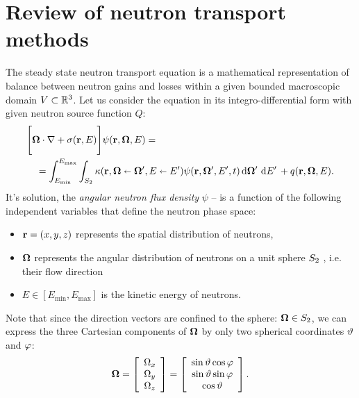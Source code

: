 \chapter{Review of neutron transport methods}\label{chap:nte-review}


The steady state neutron transport equation is a mathematical representation of balance between neutron gains and losses
within a given bounded macroscopic domain $\VV\subset\R[3]$. Let us consider the equation in its integro-differential
form with given neutron source function $Q$:
\begin{equation}\label{eq1}
  \begin{multlined}
    \Biggl[
      \bomega\cdot\grad + \sigma(\br,E)
    \Biggr]
    \psi(\br,\bomega,E) =\\
    = \intE[']{\Emin}{\Emax}{\intA[']{\kappa(\br,\bomega\sla\bomega',E\sla E')\psi(\br,\bomega',E',t)}}  + \src(\br,\bomega,E).
  \end{multlined}  
\end{equation}
It's solution, the \textit{angular neutron flux density} $\psi$ -- is a function of the following independent variables
that define the neutron phase space:
\begin{itemize}
 	\item $\br = (x,y,z)$
 	 represents the spatial distribution of
 	 neutrons,
 	\item $\bomega$ represents the angular
 	distribution of neutrons on a unit sphere $\Sphere$ , i.e. their flow direction
 	\item $E\in [E_{\text{min}},E_{\text{max}}]$ is the kinetic
 	energy of neutrons.
\end{itemize}
Note that since the direction vectors are confined to the sphere: $\bomega\in\Sphere$, we can express the three
Cartesian components of $\bomega$ by only two spherical coordinates $\polar$ and
$\azimuthal$:
\begin{equation*}
	\bomega = \left[\begin{array}{c}
		\Omega_x \\
		\Omega_y \\
		\Omega_z
	\end{array}\right] = \left[\begin{array}{c}
		\sint\cosp \\
		\sint\sinp \\
		\cost
	\end{array}\right].
\end{equation*}

